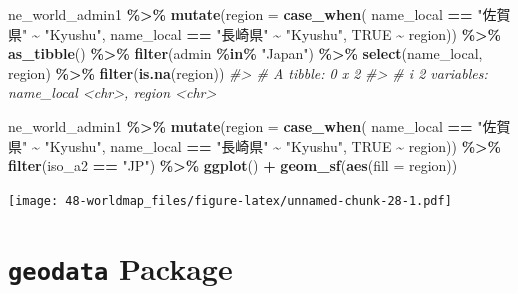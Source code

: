 \documentclass[
  xelatex, ja=standard]{bxjsbook}
\newenvironment{Shaded}{\begin{snugshade}}{\end{snugshade}}
\newcommand{\AttributeTok}[1]{\textcolor[rgb]{0.13,0.29,0.53}{#1}}
\newcommand{\CommentTok}[1]{\textcolor[rgb]{0.56,0.35,0.01}{\textit{#1}}}
\newcommand{\ConstantTok}[1]{\textcolor[rgb]{0.56,0.35,0.01}{#1}}
\newcommand{\FunctionTok}[1]{\textcolor[rgb]{0.13,0.29,0.53}{\textbf{#1}}}
\newcommand{\NormalTok}[1]{#1}
\newcommand{\SpecialCharTok}[1]{\textcolor[rgb]{0.81,0.36,0.00}{\textbf{#1}}}
\newcommand{\StringTok}[1]{\textcolor[rgb]{0.31,0.60,0.02}{#1}}
\theoremstyle{definition}
\theoremstyle{definition}
\theoremstyle{definition}
\theoremstyle{definition}
\theoremstyle{remark}
\begin{document}
\begin{Shaded}
\begin{Highlighting}[]
\NormalTok{ne\_world\_admin1 }\SpecialCharTok{\%\textgreater{}\%} \FunctionTok{mutate}\NormalTok{(}\AttributeTok{region =} \FunctionTok{case\_when}\NormalTok{(}
\NormalTok{  name\_local }\SpecialCharTok{==} \StringTok{"佐賀県"} \SpecialCharTok{\textasciitilde{}} \StringTok{"Kyushu"}\NormalTok{,}
\NormalTok{  name\_local }\SpecialCharTok{==} \StringTok{"長崎県"} \SpecialCharTok{\textasciitilde{}} \StringTok{"Kyushu"}\NormalTok{,}
  \ConstantTok{TRUE} \SpecialCharTok{\textasciitilde{}}\NormalTok{ region)) }\SpecialCharTok{\%\textgreater{}\%}
  \FunctionTok{as\_tibble}\NormalTok{() }\SpecialCharTok{\%\textgreater{}\%} \FunctionTok{filter}\NormalTok{(admin }\SpecialCharTok{\%in\%} \StringTok{"Japan"}\NormalTok{) }\SpecialCharTok{\%\textgreater{}\%} 
  \FunctionTok{select}\NormalTok{(name\_local, region) }\SpecialCharTok{\%\textgreater{}\%} \FunctionTok{filter}\NormalTok{(}\FunctionTok{is.na}\NormalTok{(region))}
\CommentTok{\#\textgreater{} \# A tibble: 0 x 2}
\CommentTok{\#\textgreater{} \# i 2 variables: name\_local \textless{}chr\textgreater{}, region \textless{}chr\textgreater{}}
\end{Highlighting}
\end{Shaded}

\begin{Shaded}
\begin{Highlighting}[]
\NormalTok{ne\_world\_admin1 }\SpecialCharTok{\%\textgreater{}\%} \FunctionTok{mutate}\NormalTok{(}\AttributeTok{region =} \FunctionTok{case\_when}\NormalTok{(}
\NormalTok{  name\_local }\SpecialCharTok{==} \StringTok{"佐賀県"} \SpecialCharTok{\textasciitilde{}} \StringTok{"Kyushu"}\NormalTok{,}
\NormalTok{  name\_local }\SpecialCharTok{==} \StringTok{"長崎県"} \SpecialCharTok{\textasciitilde{}} \StringTok{"Kyushu"}\NormalTok{,}
  \ConstantTok{TRUE} \SpecialCharTok{\textasciitilde{}}\NormalTok{ region)) }\SpecialCharTok{\%\textgreater{}\%}
  \FunctionTok{filter}\NormalTok{(iso\_a2 }\SpecialCharTok{==} \StringTok{"JP"}\NormalTok{) }\SpecialCharTok{\%\textgreater{}\%}
  \FunctionTok{ggplot}\NormalTok{() }\SpecialCharTok{+}   \FunctionTok{geom\_sf}\NormalTok{(}\FunctionTok{aes}\NormalTok{(}\AttributeTok{fill =}\NormalTok{ region))}
\end{Highlighting}
\end{Shaded}

\texttt{[image: 48-worldmap\_files/figure-latex/unnamed-chunk-28-1.pdf]}

\hypertarget{geodata-package}{%
\section{\texorpdfstring{\texttt{geodata} Package}{geodata Package}}\label{geodata-package}}
\end{document}
